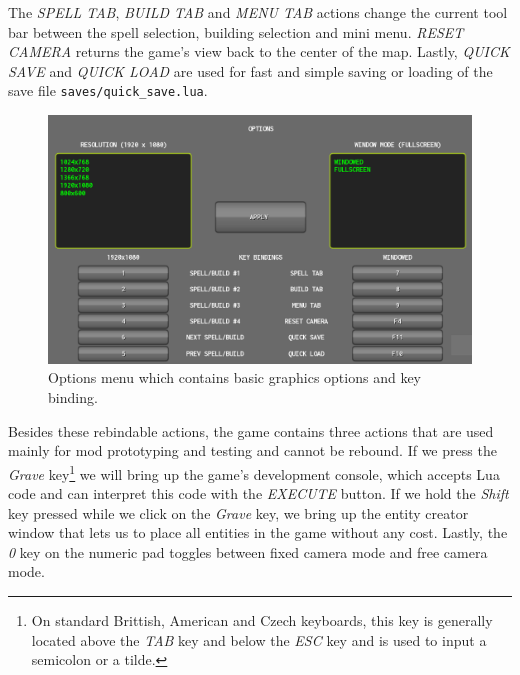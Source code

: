 The \emph{SPELL TAB}, \emph{BUILD TAB} and \emph{MENU TAB} actions change the current tool bar between the spell selection, building
selection and mini menu. \emph{RESET CAMERA} returns the game's view back to the center of the map. Lastly, \emph{QUICK SAVE} and
\emph{QUICK LOAD} are used for fast and simple saving or loading of the save file \texttt{saves/quick\_save.lua}.

\begin{figure}[H]
    \centering
    \includegraphics[width=\textwidth]{../img/gui-options.png}
    \caption{Options menu which contains basic graphics options and key binding.}
    \label{gui-options}
\end{figure}

Besides these rebindable actions, the game contains three actions that are used mainly for mod prototyping and testing and cannot be rebound.
If we press the \emph{Grave} key\footnote{On standard Brittish, American and Czech keyboards, this key is generally located above the
\emph{TAB} key and below the \emph{ESC} key and is used to input a semicolon or a tilde.} we will bring up the game's development console,
which accepts Lua code and can interpret this code with the \emph{EXECUTE} button. If we hold the \emph{Shift} key pressed while we click
on the \emph{Grave} key, we bring up the entity creator window that lets us to place all entities in the game without any cost. Lastly,
the \emph{0} key on the numeric pad toggles between fixed camera mode and free camera mode.
